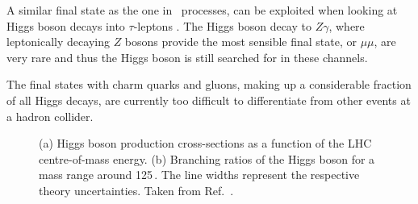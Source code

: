 A similar final state as the one in \HWW\ processes, can be exploited when looking at Higgs boson decays into $\tau$-leptons \cite{Aad:2015vsa,Sirunyan:2276465}. The Higgs boson decay to $Z\gamma$, where leptonically decaying $Z$ bosons provide the most sensible final state, or $\mu\mu$, are very rare and thus the Higgs boson is still searched for in these channels. %

The final states with charm quarks and gluons, making up a considerable fraction of all Higgs decays, are currently too difficult to differentiate from other events at a hadron collider.







\captionsetup[subfloat]{captionskip=5pt} %
\begin{figure}
  \begin{center}
  \end{center}
  \caption[(a) Higgs boson production cross-sections as a function of the LHC centre-of-mass energy. (b) Branching ratios of the Higgs boson for a mass range around 125\,\GeV.]{(a) Higgs boson production cross-sections as a function of the LHC centre-of-mass energy. (b) Branching ratios of the Higgs boson for a mass range around 125\,\GeV. The line widths represent the respective theory uncertainties. Taken from Ref.~\cite{YR4}.}
\end{figure}






